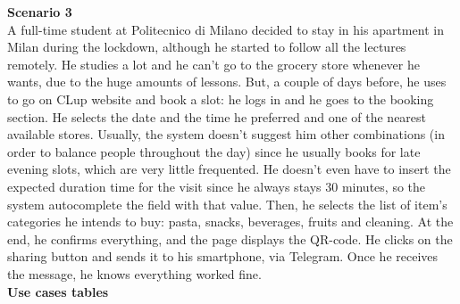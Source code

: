 \documentclass[table, 12pt]{article}
\begin{document}
\textbf{Scenario 3}\\
A full-time student at Politecnico di Milano decided to stay in his apartment in Milan during the lockdown, although he started to follow all the lectures remotely. He studies a lot and he can't go to the grocery store whenever he wants, due to the huge amounts of lessons. But, a couple of days before, he uses to go on CLup website and book a slot: he logs in and he goes to the booking section. He selects the date and the time he preferred and one of the nearest available stores. Usually, the system doesn't suggest him other combinations (in order to balance people throughout the day) since he usually books for late evening slots, which are very little frequented. He doesn't even have to insert the expected duration time for the visit since he always stays 30 minutes, so the system autocomplete the field with that value. Then, he selects the list of item's categories he intends to buy: pasta, snacks, beverages, fruits and cleaning. At the end, he confirms everything, and the page displays the QR-code. He clicks on the sharing button and sends it to his smartphone, via Telegram. Once he receives the message, he knows everything worked fine.\\

\newpage
\textbf{Use cases tables}\\
\end{document}
